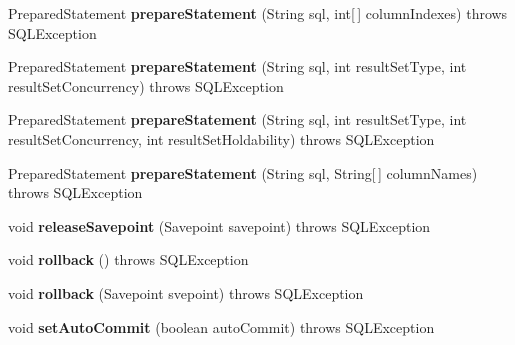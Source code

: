 \begin{DoxyCompactItemize}
Prepared\+Statement {\bfseries prepare\+Statement} (String sql, int\mbox{[}$\,$\mbox{]} column\+Indexes)  throws S\+Q\+L\+Exception 
\item 
\mbox{\label{classsimpledb_1_1jdbc_1_1ConnectionAdapter_afc0e0b6829563dfacd3d2fbd4d70bf8e}} 
Prepared\+Statement {\bfseries prepare\+Statement} (String sql, int result\+Set\+Type, int result\+Set\+Concurrency)  throws S\+Q\+L\+Exception 
\item 
\mbox{\label{classsimpledb_1_1jdbc_1_1ConnectionAdapter_a603c90307e0ed1464c8a2834ecf980dd}} 
Prepared\+Statement {\bfseries prepare\+Statement} (String sql, int result\+Set\+Type, int result\+Set\+Concurrency, int result\+Set\+Holdability)  throws S\+Q\+L\+Exception 
\item 
\mbox{\label{classsimpledb_1_1jdbc_1_1ConnectionAdapter_ad569823fe27eee66e281b095f7807325}} 
Prepared\+Statement {\bfseries prepare\+Statement} (String sql, String\mbox{[}$\,$\mbox{]} column\+Names)  throws S\+Q\+L\+Exception 
\item 
\mbox{\label{classsimpledb_1_1jdbc_1_1ConnectionAdapter_a3c1db0b3a439764c4173f23267271258}} 
void {\bfseries release\+Savepoint} (Savepoint savepoint)  throws S\+Q\+L\+Exception 
\item 
\mbox{\label{classsimpledb_1_1jdbc_1_1ConnectionAdapter_a408ec91b45b0dfdee44d90fdba88372b}} 
void {\bfseries rollback} ()  throws S\+Q\+L\+Exception 
\item 
\mbox{\label{classsimpledb_1_1jdbc_1_1ConnectionAdapter_a1d24f646d3f223e8caca95423d1f444c}} 
void {\bfseries rollback} (Savepoint svepoint)  throws S\+Q\+L\+Exception 
\item 
\mbox{\label{classsimpledb_1_1jdbc_1_1ConnectionAdapter_a849cd621cae2a69dc56cde710bb4ace6}} 
void {\bfseries set\+Auto\+Commit} (boolean auto\+Commit)  throws S\+Q\+L\+Exception 
\item 
\mbox{\label{classsimpledb_1_1jdbc_1_1ConnectionAdapter_a584426c9d07de9287ba1caebe57d1778}} 

\end{DoxyCompactItemize}
